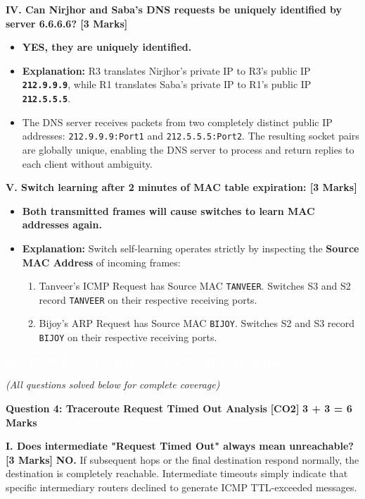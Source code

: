 \documentclass[11pt,a4paper]{article}
\newcommand{\questionheader}[3]{
    \vspace{0.35cm}
    \noindent\colorbox{qboxbg}{
        \parbox{\dimexpr\textwidth-2\fboxsep\relax}{
            \textbf{\textcolor{primary}{\large #1}} \hfill \textbf{\textcolor{accent}{[#2]}} \hfill \textbf{\textcolor{secondary}{#3 Marks}}
        }
    }
    \vspace{0.15cm}
}
\newcommand{\sectionbanner}[1]{
    \vspace{0.5cm}
    \noindent\colorbox{primary}{
        \parbox{\dimexpr\textwidth-2\fboxsep\relax}{
            \centering \textbf{\textcolor{white}{\Large #1}}
        }
    }
    \vspace{0.25cm}
}
\begin{document}
\textbf{IV. Can Nirjhor and Saba's DNS requests be uniquely identified by server 6.6.6.6? [3 Marks]}
\begin{itemize}
    \item \textbf{YES, they are uniquely identified.}
    \item \textbf{Explanation:} R3 translates Nirjhor's private IP to R3's public IP \textbf{\texttt{212.9.9.9}}, while R1 translates Saba's private IP to R1's public IP \textbf{\texttt{212.5.5.5}}.
    \item The DNS server receives packets from two completely distinct public IP addresses: \texttt{212.9.9.9:Port1} and \texttt{212.5.5.5:Port2}. The resulting socket pairs are globally unique, enabling the DNS server to process and return replies to each client without ambiguity.
\end{itemize}

\textbf{V. Switch learning after 2 minutes of MAC table expiration: [3 Marks]}
\begin{itemize}
    \item \textbf{Both transmitted frames will cause switches to learn MAC addresses again.}
    \item \textbf{Explanation:} Switch self-learning operates strictly by inspecting the \textbf{Source MAC Address} of incoming frames:
    \begin{enumerate}
        \item Tanveer's ICMP Request has Source MAC \texttt{TANVEER}. Switches S3 and S2 record \texttt{TANVEER} on their respective receiving ports.
        \item Bijoy's ARP Request has Source MAC \texttt{BIJOY}. Switches S2 and S3 record \texttt{BIJOY} on their respective receiving ports.
    \end{enumerate}
\end{itemize}

\newpage
\sectionbanner{SECTION B: ANY TWO OUT OF THREE (12 MARKS)}
\textit{(All questions solved below for complete coverage)}

\questionheader{Question 4: Traceroute Request Timed Out Analysis}{CO2}{3 + 3 = 6}

\textbf{I. Does intermediate "Request Timed Out" always mean unreachable? [3 Marks]}
\textbf{NO.} If subsequent hops or the final destination respond normally, the destination is completely reachable. Intermediate timeouts simply indicate that specific intermediary routers declined to generate ICMP TTL-exceeded messages.
\end{document}
